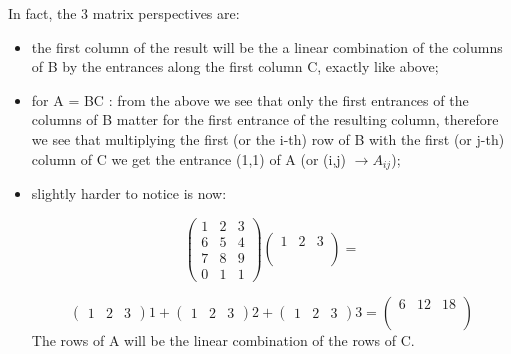 \documentclass[12pt, a4paper]{article}
\begin{document}
\par In fact, the 3 matrix perspectives are:
\begin{itemize}
    \item the first column of the result will be the a linear combination of the columns of B by the entrances along the first column C, exactly like above;
    \item for A = BC : from the above we see that only the first entrances of the columns of B matter for the first entrance of the resulting column, therefore we see that multiplying the first (or the i-th) row of B with the first (or j-th) column of C we get the  entrance (1,1) of A (or (i,j)  $\rightarrow A_{ij}$);
    \item slightly harder to notice is now:
    
\begin{equation*}
    \begin{pmatrix}
        1 & 2 & 3 \\
        6 & 5 & 4 \\
        7 & 8 & 9 \\
        0 & 1 & 1
    \end{pmatrix}
    \begin{pmatrix}
        1 & 2 & 3 \\
         &  &  \\
         &  &  \\
    \end{pmatrix}
    =
\end{equation*}

\begin{equation*}
    \begin{pmatrix}
        1 & 2 & 3
    \end{pmatrix}1 + 
    \begin{pmatrix}
        1 & 2 & 3
    \end{pmatrix}2 + 
    \begin{pmatrix}
        1 & 2 & 3
    \end{pmatrix}3 = 
    \begin{pmatrix}
        6 & 12 & 18 \\
         &  &  \\
         &  &  \\
         &  & 
    \end{pmatrix}
\end{equation*}
        The rows of A will be the linear combination of the rows of C.
\end{itemize}
\end{document}

